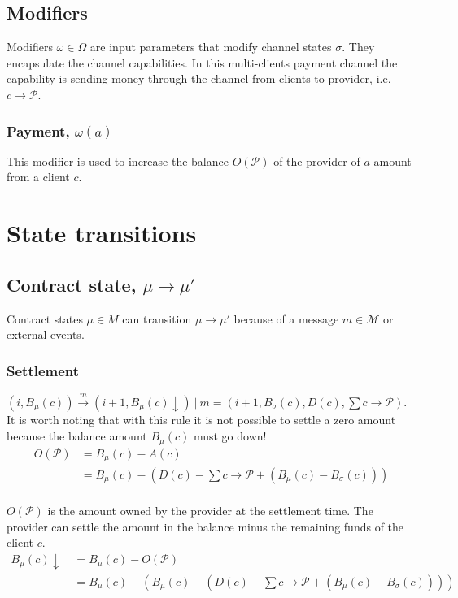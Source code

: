 \documentclass{llncs}
\begin{document}
\subsection{Modifiers} Modifiers $\omega \in \Omega$ are input parameters that modify channel states $\sigma$. They encapsulate the channel capabilities. In this multi-clients payment channel the capability is sending money through the channel from clients to provider, i.e. $c \rightarrow \mathcal{P}$.

\subsubsection{Payment, $\omega(a)$} This modifier is used to increase the balance $O(\mathcal{P})$ of the provider of $a$ amount from a client $c$.

\section{State transitions}

\subsection{Contract state, $\mu \rightarrow \mu'$} Contract states $\mu \in M$ can transition $\mu \rightarrow \mu'$ because of a message $m \in \mathcal{M}$ or external events.

\subsubsection{Settlement} $(i, B_\mu(c)) \xrightarrow{m} (i+1, B_\mu(c)\downarrow)\ |\ m = (i+1, B_\sigma(c), D(c), \sum c \rightarrow \mathcal{P})$. It is worth noting that with this rule it is not possible to settle a zero amount because the balance amount $B_\mu(c)$ must go down!
\begin{equation*}
\begin{split}
    O(\mathcal{P}) &= B_\mu(c) - A(c) \\
    &= B_\mu(c) - (D(c) - \textstyle \sum c \rightarrow \mathcal{P} + (B_\mu(c) - B_\sigma(c))) \\
\end{split}
\end{equation*}

$O(\mathcal{P})$ is the amount owned by the provider at the settlement time. The provider can settle the amount in the balance minus the remaining funds of the client $c$.
\begin{equation*}
\begin{split}
    B_\mu(c)\downarrow \ &= B_\mu(c) - O(\mathcal{P}) \\
    &= B_\mu(c) -(B_\mu(c) - (D(c) - \textstyle \sum c \rightarrow \mathcal{P} + (B_\mu(c) - B_\sigma(c)))) \\
\end{split}
\end{equation*}
\end{document}
